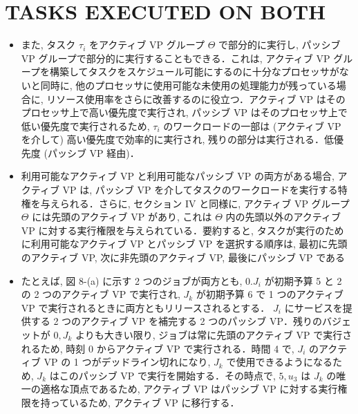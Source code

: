 
\section{TASKS EXECUTED ON BOTH}
\label{sec: tasks executed on both}

\begin{frame}{}
    \begin{itemize}
        \item また, タスク $\tau_{i}$ をアクティブ VP グループ $\Theta$ で部分的に実行し, パッシブ VP グループで部分的に実行することもできる．これは, アクティブ VP グループを構築してタスクをスケジュール可能にするのに十分なプロセッサがないと同時に, 他のプロセッサに使用可能な未使用の処理能力が残っている場合に, リソース使用率をさらに改善するのに役立つ．アクティブ VP はそのプロセッサ上で高い優先度で実行され, パッシブ VP はそのプロセッサ上で低い優先度で実行されるため, $\tau_{i}$ のワークロードの一部は (アクティブ VP を介して) 高い優先度で効率的に実行され, 残りの部分は実行される．低優先度 (パッシブ VP 経由)．
    \end{itemize}
\end{frame}

\begin{frame}{}
    \begin{itemize}
        \item 利用可能なアクティブ VP と利用可能なパッシブ VP の両方がある場合, アクティブ VP は, パッシブ VP を介してタスクのワークロードを実行する特権を与えられる．さらに, セクション IV と同様に, アクティブ VP グループ $\Theta$ には先頭のアクティブ VP があり, これは $\Theta$ 内の先頭以外のアクティブ VP に対する実行権限を与えられている．要約すると, タスクが実行のために利用可能なアクティブ VP とパッシブ VP を選択する順序は, 最初に先頭のアクティブ VP, 次に非先頭のアクティブ VP, 最後にパッシブ VP である
    \end{itemize}
\end{frame}

\begin{frame}{}
    \begin{itemize}
        \item たとえば, 図 8-(a) に示す 2 つのジョブが両方とも, $0 . J_{i}$ が初期予算 5 と 2 の 2 つのアクティブ VP で実行され, $J_{k}$ が初期予算 6 で 1 つのアクティブ VP で実行されるときに両方ともリリースされるとする． $J_{i}$ にサービスを提供する 2 つのアクティブ VP を補完する 2 つのパッシブ VP．残りのバジェットが $0, J_{k}$ よりも大きい限り, ジョブは常に先頭のアクティブ VP で実行されるため, 時刻 0 からアクティブ VP で実行される．時間 4 で,  $J_{i}$ のアクティブ VP の 1 つがデッドライン切れになり, $J_{k}$ で使用できるようになるため, $J_{k}$ はこのパッシブ VP で実行を開始する．その時点で, $5, u_{3}$ は $J_{k}$ の唯一の適格な頂点であるため, アクティブ VP はパッシブ VP に対する実行権限を持っているため, アクティブ VP に移行する．
    \end{itemize}
\end{frame}

